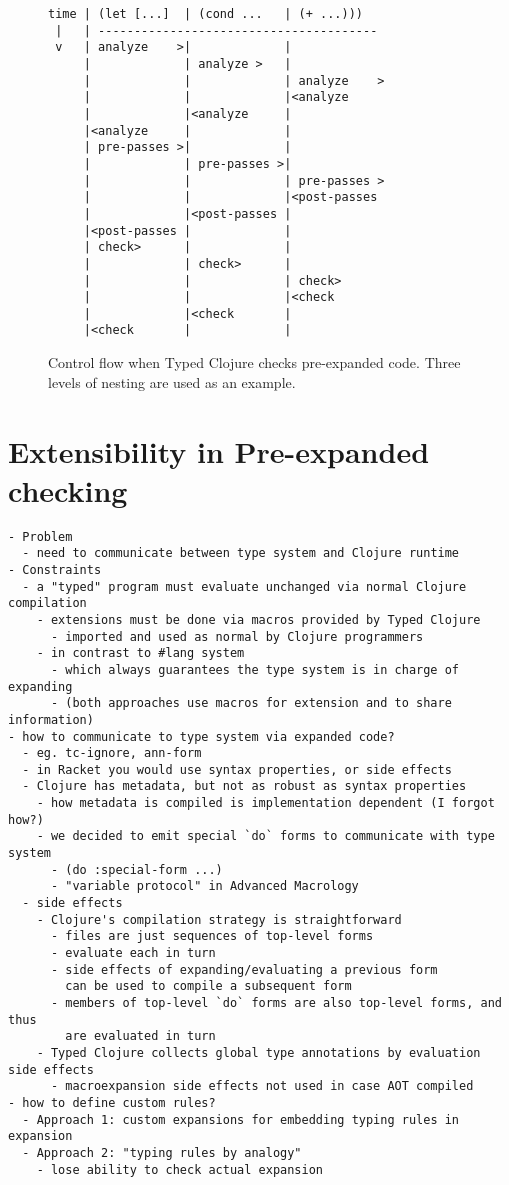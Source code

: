 \begin{figure}
\singlespacing
\begin{verbatim}
time | (let [...]  | (cond ...   | (+ ...)))
 |   | ---------------------------------------
 v   | analyze    >|             |
     |             | analyze >   |
     |             |             | analyze    >
     |             |             |<analyze
     |             |<analyze     |
     |<analyze     |             |
     | pre-passes >|             |
     |             | pre-passes >|
     |             |             | pre-passes >
     |             |             |<post-passes
     |             |<post-passes |
     |<post-passes |             |
     | check>      |             |
     |             | check>      |
     |             |             | check>
     |             |             |<check
     |             |<check       |
     |<check       |             |
\end{verbatim}
  \caption{Control flow when Typed Clojure checks pre-expanded code.
  Three levels of nesting are used as an example.
  }
  \label{fig:analyzer:control-flow-pre-expand}
\end{figure}

\chapter{Extensibility in Pre-expanded checking}

{
\singlespacing
\begin{verbatim}
- Problem
  - need to communicate between type system and Clojure runtime
- Constraints
  - a "typed" program must evaluate unchanged via normal Clojure compilation
    - extensions must be done via macros provided by Typed Clojure
      - imported and used as normal by Clojure programmers
    - in contrast to #lang system
      - which always guarantees the type system is in charge of expanding
      - (both approaches use macros for extension and to share information)
- how to communicate to type system via expanded code?
  - eg. tc-ignore, ann-form
  - in Racket you would use syntax properties, or side effects
  - Clojure has metadata, but not as robust as syntax properties
    - how metadata is compiled is implementation dependent (I forgot how?)
    - we decided to emit special `do` forms to communicate with type system
      - (do :special-form ...)
      - "variable protocol" in Advanced Macrology
  - side effects
    - Clojure's compilation strategy is straightforward
      - files are just sequences of top-level forms
      - evaluate each in turn
      - side effects of expanding/evaluating a previous form
        can be used to compile a subsequent form
      - members of top-level `do` forms are also top-level forms, and thus
        are evaluated in turn
    - Typed Clojure collects global type annotations by evaluation side effects
      - macroexpansion side effects not used in case AOT compiled
- how to define custom rules?
  - Approach 1: custom expansions for embedding typing rules in expansion
  - Approach 2: "typing rules by analogy"
    - lose ability to check actual expansion
\end{verbatim}
}

